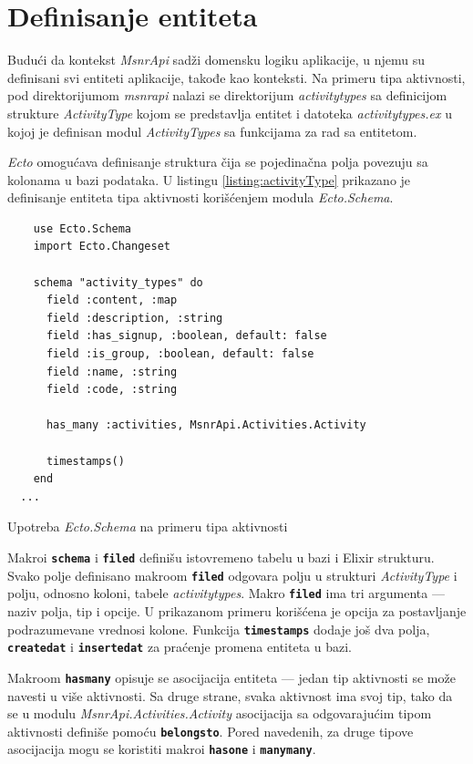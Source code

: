 \documentclass[12pt,oneside]{memoir}
\begin{document}
\section{Definisanje entiteta}
Budući da kontekst \emph{MsnrApi} sadži domensku logiku aplikacije, u njemu su definisani svi entiteti aplikacije, takođe
kao konteksti. Na primeru tipa aktivnosti, pod direktorijumom \emph{msnr{\textunderscore}api} nalazi se direktorijum
\emph{activity{\textunderscore}types} sa definicijom strukture \emph{ActivityType} kojom se predstavlja
entitet i datoteka \emph{activity{\textunderscore}types.ex} u kojoj je definisan modul \emph{ActivityTypes} sa
funkcijama za rad sa entitetom.

\emph{Ecto} omogućava definisanje struktura čija se pojedinačna polja povezuju sa kolonama u bazi podataka. 
U listingu \ref{listing:activityType} prikazano je definisanje entiteta tipa aktivnosti korišćenjem modula
\emph{Ecto.Schema}.
\begin{listing}[!h]
  \begin{verbatim}
    use Ecto.Schema
    import Ecto.Changeset
  
    schema "activity_types" do
      field :content, :map
      field :description, :string
      field :has_signup, :boolean, default: false
      field :is_group, :boolean, default: false
      field :name, :string
      field :code, :string
  
      has_many :activities, MsnrApi.Activities.Activity
  
      timestamps()
    end
  ...
\end{verbatim}
\caption{Upotreba \emph{Ecto.Schema} na primeru tipa aktivnosti }
\label{listing:activityType}
\end{listing}
Makroi \texttt{\textbf{schema}} i \texttt{\textbf{filed}} definišu istovremeno tabelu u bazi i Elixir
strukturu. Svako polje definisano makroom \texttt{\textbf{filed}} odgovara polju u strukturi 
\emph{ActivityType} i polju, odnosno koloni, tabele \emph{activity{\textunderscore}types}.
Makro \texttt{\textbf{filed}} ima tri argumenta --- naziv polja, tip i opcije. U prikazanom primeru korišćena je
opcija za postavljanje podrazumevane vrednosi kolone. Funkcija \texttt{\textbf{timestamps}} dodaje još dva polja,
\texttt{\textbf{created{\textunderscore}at}} i \texttt{\textbf{inserted{\textunderscore}at}} za praćenje 
promena entiteta u bazi. 

Makroom \texttt{\textbf{has{\textunderscore}many}} opisuje se asocijacija 
entiteta --- jedan tip aktivnosti se može navesti u više aktivnosti. Sa druge strane, svaka aktivnost ima svoj tip,
tako da se u modulu \emph{MsnrApi.Activities.Activity} asocijacija sa odgovarajućim tipom aktivnosti definiše pomoću \texttt{\textbf{belongs{\textunderscore}to}}.
Pored navedenih, za druge tipove asocijacija
mogu se koristiti makroi \texttt{\textbf{has{\textunderscore}one}} i \texttt{\textbf{many{\textunderscore}many}}.
\end{document}
